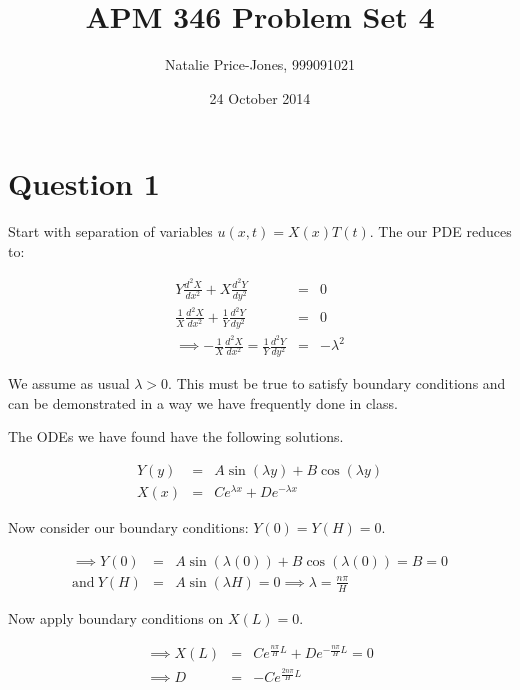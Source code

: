 \documentclass[a4paper,12pt]{article}
\begin{document}
\onehalfspacing
\title{APM 346 Problem Set 4}
\author{Natalie Price-Jones, 999091021}
\date{24 October 2014}
\maketitle

\section{Question 1}

Start with separation of variables $u(x,t) = X(x)T(t)$. The our PDE reduces to:

\begin{eqnarray}
Y\frac{d^2X}{dx^2} + X\frac{d^2Y}{dy^2} &=& 0\nonumber\\
\frac{1}{X}\frac{d^2X}{dx^2} + \frac{1}{Y}\frac{d^2Y}{dy^2} &=& 0\nonumber\\
\implies -\frac{1}{X}\frac{d^2X}{dx^2} = \frac{1}{Y}\frac{d^2Y}{dy^2} &=& -\lambda^2\nonumber
\end{eqnarray}

We assume as usual $\lambda > 0$. This must be true to satisfy boundary conditions and can be demonstrated in a way we have frequently done in class.

The ODEs we have found have the following solutions.

\begin{eqnarray}
Y(y) &=& A\sin(\lambda y) + B\cos(\lambda y)\nonumber\\
X(x) &=& Ce^{\lambda x} + De^{-\lambda x}\nonumber 
\end{eqnarray}

Now consider our boundary conditions: $Y(0) = Y(H) = 0$.

\begin{eqnarray}
\implies Y(0) &=& A\sin(\lambda(0)) + B\cos(\lambda(0)) = B = 0\nonumber\\
\mathrm{and}\: Y(H) &=& A\sin(\lambda H) = 0 \implies \lambda = \frac{n\pi}{H}\nonumber
\end{eqnarray}

Now apply boundary conditions on $X(L) = 0$.

\begin{eqnarray}
\implies X(L) &=& Ce^{\frac{n\pi}{H}L} + De^{-\frac{n\pi}{H}L} = 0\nonumber\\
\implies D &=& -Ce^{\frac{2n\pi}{H}L}\nonumber
\end{eqnarray}
\end{document}
